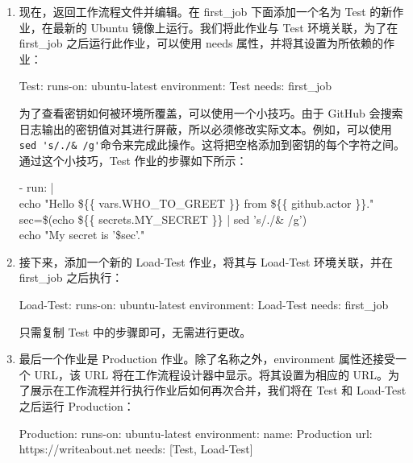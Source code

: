 \begin{enumerate}
\item 
现在，返回工作流程文件并编辑。在 first\_job 下面添加一个名为 Test 的新作业，在最新的 Ubuntu 镜像上运行。我们将此作业与 Test 环境关联，为了在 first\_job 之后运行此作业，可以使用 needs 属性，并将其设置为所依赖的作业：

\begin{shell}
Test:
  runs-on: ubuntu-latest
  environment: Test
  needs: first_job
\end{shell}

为了查看密钥如何被环境所覆盖，可以使用一个小技巧。由于 GitHub 会搜索日志输出的密钥值对其进行屏蔽，所以必须修改实际文本。例如，可以使用 \verb|sed 's/./& /g'|命令来完成此操作。这将把空格添加到密钥的每个字符之间。通过这个小技巧，Test 作业的步骤如下所示：

\begin{tcolorbox}[ breakable,colback = bashcodebg, colframe= black!50!white]
\scriptsize{
- run: | \\
\hspace*{2em}echo "Hello \$\{\{ vars.WHO\_TO\_GREET \}\}  from \$\{\{ github.actor \}\}." \\
\hspace*{2em}sec=\$(echo \$\{\{ secrets.MY\_SECRET \}\} | sed 's/./\& /g') \\
\hspace*{2em}echo "My secret is  '\$sec'."
}
\end{tcolorbox}

\item 
接下来，添加一个新的 Load-Test 作业，将其与 Load-Test 环境关联，并在 first\_job 之后执行：

\begin{shell}
Load-Test:
  runs-on: ubuntu-latest
  environment: Load-Test
  needs: first_job
\end{shell}

只需复制 Test 中的步骤即可，无需进行更改。

\item 
最后一个作业是 Production 作业。除了名称之外，environment 属性还接受一个 URL，该 URL 将在工作流程设计器中显示。将其设置为相应的 URL。为了展示在工作流程并行执行作业后如何再次合并，我们将在 Test 和 Load-Test 之后运行 Production：

\begin{shell}
Production:
  runs-on: ubuntu-latest
  environment:
    name: Production
    url: https://writeabout.net
  needs: [Test, Load-Test]
\end{shell}


\end{enumerate}
